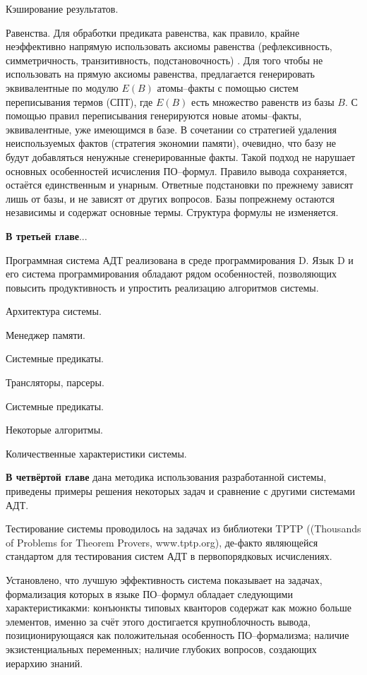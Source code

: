 \documentclass[a4paper]{report}
\begin{document}
Кэширование результатов.

Равенства. Для обработки предиката равенства, как правило, крайне неэффективно напрямую использовать аксиомы равенства (рефлексивность, симметричность, транзитивность, подстановочность) . Для того чтобы не использовать на прямую аксиомы равенства, предлагается генерировать эквивалентные по модулю $E(B)$ атомы--факты с помощью систем переписывания термов (СПТ), где $E(B)$ есть множество равенств из базы $B$. С помощью правил переписывания генерируются новые атомы--факты, эквивалентные, уже имеющимся в базе. В сочетании со стратегией удаления неиспользуемых фактов (стратегия экономии памяти), очевидно, что базу не будут добавляться ненужные сгенерированные факты. Такой подход не нарушает основных особенностей исчисления ПО--формул. Правило вывода сохраняется, остаётся единственным и унарным. Ответные подстановки по прежнему зависят лишь от базы, и не зависят от других вопросов. Базы попрежнему остаются независимы и содержат основные термы. Структура формулы не изменяется.




\textbf{В третьей главе}...

Программная система АДТ реализована в среде программирования D. Язык D и его система программирования обладают рядом особенностей, позволяющих повысить продуктивность и упростить реализацию алгоритмов системы.

Архитектура системы.

Менеджер памяти.

Системные предикаты.

Трансляторы, парсеры.

Системные предикаты.

Некоторые алгоритмы.

Количественные характеристики системы.


\textbf{В четвёртой главе} дана методика использования разработанной системы, приведены примеры решения некоторых задач и сравнение с другими системами АДТ.

Тестирование системы проводилось на задачах из библиотеки TPTP ((Thousands of Problems for Theorem Provers, www.tptp.org), де-факто являющейся стандартом для тестирования систем АДТ в первопорядковых исчислениях. 

Установлено, что лучшую эффективность система показывает на задачах, формализация которых в языке ПО--формул обладает следующими характеристикакми: конъюнкты типовых кванторов содержат как можно больше элементов, именно за счёт этого достигается крупноблочность вывода, позиционирующаяся как положительная особенность ПО--формализма; наличие экзистенциальных переменных; наличие глубоких вопросов, создающих иерархию знаний.
\end{document}
